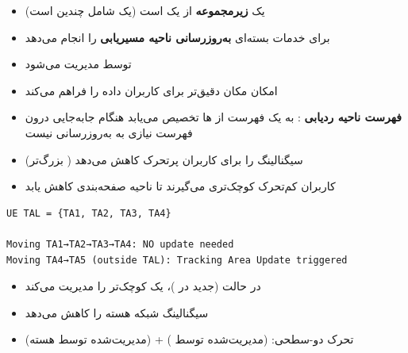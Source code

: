 \begin{itemize}
\tightlist
\item
   یک \textbf{زیرمجموعه} از یک  است (یک  شامل چندین  است)
\item
   برای خدمات بسته‌ای \textbf{به‌روزرسانی ناحیه مسیریابی } را انجام می‌دهد
\item
  توسط  مدیریت می‌شود
\item
  امکان مکان دقیق‌تر برای کاربران داده را فراهم می‌کند
\end{itemize}


\begin{itemize}
\tightlist
\item
  \textbf{فهرست ناحیه ردیابی }: به  یک فهرست از ها تخصیص می‌یابد  هنگام جابه‌جایی درون فهرست نیازی به به‌روزرسانی نیست
\item
  سیگنالینگ را برای کاربران پرتحرک کاهش می‌دهد ( بزرگ‌تر)
\item
  کاربران کم‌تحرک  کوچک‌تری می‌گیرند تا ناحیه صفحه‌بندی کاهش یابد
\end{itemize}

\def\CNcodelang{}

\begin{CNplaincode}
\begin{Verbatim}
UE TAL = {TA1, TA2, TA3, TA4}

Moving TA1→TA2→TA3→TA4: NO update needed
Moving TA4→TA5 (outside TAL): Tracking Area Update triggered
\end{Verbatim}
\end{CNplaincode}


\begin{itemize}
\tightlist
\item
  در حالت  (جدید در )،  یک  کوچک‌تر را مدیریت می‌کند
\item
  سیگنالینگ شبکه هسته را کاهش می‌دهد
\item
  تحرک دو-سطحی:  (مدیریت‌شده توسط ) +  (مدیریت‌شده توسط هسته)
\end{itemize}

